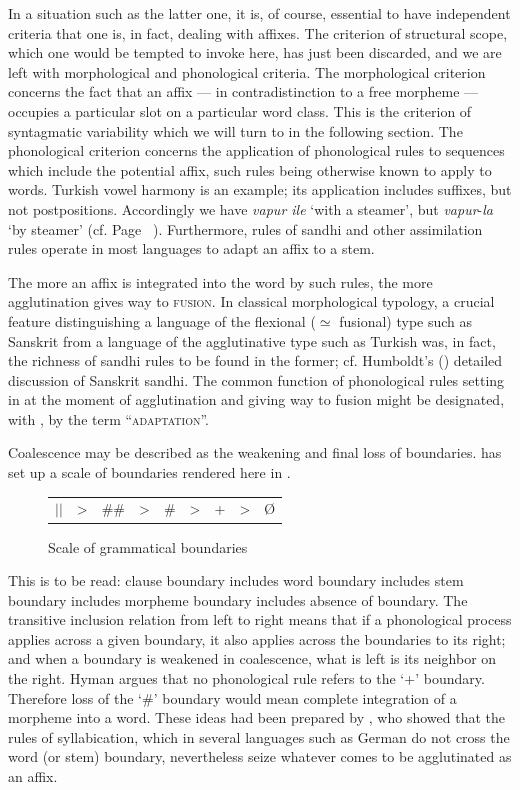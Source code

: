 In a situation such as the latter one, it is, of course, essential to have independent criteria that one is, in fact, dealing with affixes. The criterion of structural scope, which one would be tempted to invoke here, has just been discarded, and we are left with morphological and phonological criteria. The morphological criterion concerns the fact that an affix — in contradistinction to a free morpheme — occupies a particular slot on a particular word class. This is the criterion of syntagmatic variability which we will turn to in the following section. The phonological criterion concerns the application of phonological rules to sequences which include the potential affix, such rules being otherwise known to apply to words. Turkish vowel harmony is an example; its application includes suffixes, but not postpositions. Accordingly we have \textit{vapur ile} ‘with a steamer’, but \textit{vapur}{}-\textit{la} ‘by steamer’ (cf. Page~\pageref{page89}\chk%
 ). Furthermore, rules of sandhi and other assimilation rules operate in most languages to adapt an affix to a stem.

The more an affix is integrated into the word by such rules, the more agglutination gives way to \textsc{fusion}. In classical morphological typology, a crucial feature distinguishing a language of the flexional (${\simeq}$ fusional) type such as Sanskrit from a language of the agglutinative type such as Turkish was, in fact, the richness of sandhi rules to be found in the former; cf. Humboldt's (\citeyear[506--511]{Humboldt1836}) detailed discussion of Sanskrit sandhi. The common function of phonological rules setting in at the moment of agglutination and giving way to fusion might be designated, with \citet[17--20]{HeineEtAl1984}, by the term ``\textsc{adaptation}''.

Coalescence may be described as the weakening and final loss of boundaries. \citet[esp. §~4]{Hyman1978} has set up a scale of boundaries rendered here in .

\begin{figure}
\begin{tabular}{ccccccccc}
\setlength{\tabcolsep}{2em}
$||$ & {\textgreater} & \#\# & {\textgreater} & \# & {\textgreater} & + & {\textgreater} & Ø
\end{tabular}
\caption{Scale of grammatical boundaries}\label{F10}
\end{figure}

\noindent This is to be read: clause boundary includes word boundary includes stem boundary includes morpheme boundary includes absence of boundary. The transitive inclusion relation from left to right means that if a phonological process applies across a given boundary, it also applies across the boundaries to its right; and when a boundary is weakened in coalescence, what is left is its neighbor on the right. Hyman argues that no phonological rule refers to the ‘+’ boundary. Therefore loss of the ‘\#’ boundary would mean complete integration of a morpheme into a word. These ideas had been prepared by \citet[211]{Kuryłowicz1948}, who showed that the rules of syllabication, which in several languages such as German do not cross the word (or stem) boundary, nevertheless seize whatever comes to be agglutinated as an affix.

